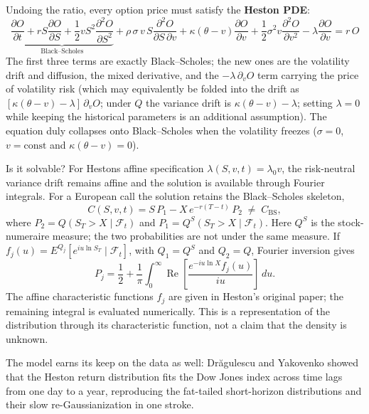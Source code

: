 Undoing the ratio, every option price must satisfy the \textbf{Heston PDE}:
\begin{equation}\label{eq:heston-pde}
\boxed{\ \underbrace{\frac{\partial O}{\partial t} + rS\frac{\partial O}{\partial S} + \frac{1}{2}vS^2\frac{\partial^2 O}{\partial S^2}}_{\text{Black--Scholes}} + \rho\,\sigma\, v\, S\frac{\partial^2 O}{\partial S\,\partial v} + \kappa(\theta - v)\frac{\partial O}{\partial v} + \frac{1}{2}\sigma^2 v\frac{\partial^2 O}{\partial v^2} - \lambda\frac{\partial O}{\partial v} = r\, O\ }
\end{equation}
The first three terms are exactly Black--Scholes; the new ones are the volatility drift and diffusion, the mixed derivative, and the $-\lambda\,\partial_v O$ term carrying the price of volatility risk (which may equivalently be folded into the drift as $[\kappa(\theta-v)-\lambda]\,\partial_v O$; under $Q$ the variance drift is $\kappa(\theta-v)-\lambda$; setting $\lambda=0$ while keeping the historical parameters is an additional assumption).
The equation duly collapses onto Black--Scholes when the volatility freezes ($\sigma=0$, $v=\text{const}$ and $\kappa(\theta-v)=0$).

Is it solvable?
For Heston\textquotesingle s affine specification $\lambda(S,v,t)=\lambda_0v$, the risk-neutral variance drift remains affine and the solution is available through Fourier integrals.
For a European call the solution retains the Black--Scholes skeleton,
\begin{equation}
C(S,v,t) = S\,P_1 - X\,e^{-r(T-t)}\,P_2 \;\neq\; C_{\text{BS}},
\end{equation}
where $P_2=Q(S_T>X\mid\mathcal F_t)$ and $P_1=Q^S(S_T>X\mid\mathcal F_t)$.
Here $Q^S$ is the stock-numeraire measure; the two probabilities are not under the same measure.
If $f_j(u)=E^{Q_j}[e^{iu\ln S_T}\mid\mathcal F_t]$, with $Q_1=Q^S$ and $Q_2=Q$, Fourier inversion gives
\[
 P_j=\frac12+\frac1\pi\int_0^\infty
 \operatorname{Re}\left[\frac{e^{-iu\ln X}f_j(u)}{iu}\right]\,du.
\]
The affine characteristic functions $f_j$ are given in Heston's original paper\cite{Heston1993}; the remaining integral is evaluated numerically.
This is a representation of the distribution through its characteristic function, not a claim that the density is unknown.

The model earns its keep on the data as well: Dr\u{a}gulescu and Yakovenko showed that the Heston return distribution fits the Dow Jones index across time lags from one day to a year, reproducing the fat-tailed short-horizon distributions and their slow re-Gaussianization in one stroke\cite{DragulescuYakovenko2002}.


